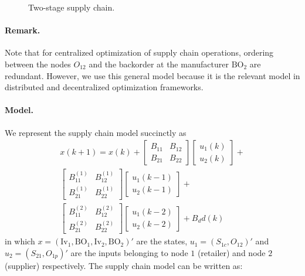 \documentclass[10pt]{article}
\newcommand{\BO}{\textrm{BO}}
\newcommand{\Inv}{\textrm{Iv}}
\theoremstyle{definition}
\begin{document}
\begin{figure}
\centering
\resizebox{0.9\textwidth}{!}{}
\caption{Two-stage supply chain.}
\label{fig:2stage}
\end{figure}

\paragraph{Remark.} Note that for centralized optimization of supply
chain operations, ordering between the nodes $O_{12}$ and the
backorder at the manufacturer $\BO_2$ are redundant. However, we use
this general model because it is the relevant model in distributed and
decentralized optimization frameworks.

\paragraph{Model.} We represent the supply chain model succinctly as
\begin{multline}
\label{eq:model0}
 x(k+1) = x(k)+\begin{bmatrix}B_{11}&B_{12}\\B_{21}&B_{22}\end{bmatrix}
 \begin{bmatrix}u_1(k)\\u_2(k)\end{bmatrix}+\\
 \begin{bmatrix}B_{11}^{(1)}&B_{12}^{(1)}\\B_{21}^{(1)}&B_{22}^{(1)}\end{bmatrix}
 \begin{bmatrix}u_1(k-1)\\u_2(k-1)\end{bmatrix}+
\\\begin{bmatrix}B_{11}^{(2)}&B_{12}^{(2)}\\B_{21}^{(2)}&B_{22}^{(2)}\end{bmatrix}
  \begin{bmatrix}u_1(k-2)\\u_2(k-2)\end{bmatrix}+B_dd(k)   
\end{multline}
in which $x = (\Inv_1,\BO_1,\Inv_2,\BO_2)'$ are the states, $u_1 = (S_{1c},O_{12})'$
and $u_2 = (S_{21},O_{1p})'$ are the inputs belonging to node $1$
(retailer) and node $2$ (supplier) respectively. The supply chain
model can be written as:
\end{document}
